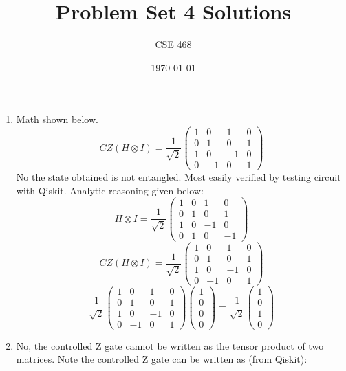 \documentclass[12pt]{article}
\title{Problem Set 4 Solutions}
\author{CSE 468}
\date{\today}
\begin{document}
\maketitle

\begin{enumerate}[font=\bfseries]
    \item Math shown below.
    \[CZ(H \otimes I) = \frac{1}{\sqrt{2}}
    \begin{pmatrix}
    1 & 0 & 1 & 0 \\
    0 & 1 & 0 & 1 \\
    1 & 0 & -1 & 0 \\
    0 & -1 & 0 & 1
    \end{pmatrix}
    \]
    No the state obtained is not entangled. Most easily verified by testing circuit with Qiskit. Analytic reasoning given below:
    \[H \otimes I = \frac{1}{\sqrt{2}}\begin{pmatrix}
    1 & 0 & 1 & 0 \\
    0 & 1 & 0 & 1 \\
    1 & 0 & -1 & 0 \\
    0 & 1 & 0 & -1
    \end{pmatrix}\]
    \[CZ(H \otimes I) = \frac{1}{\sqrt{2}}
    \begin{pmatrix}
    1 & 0 & 1 & 0 \\
    0 & 1 & 0 & 1 \\
    1 & 0 & -1 & 0 \\
    0 & -1 & 0 & 1
    \end{pmatrix}
    \]
    \[\frac{1}{\sqrt{2}}
    \begin{pmatrix}
    1 & 0 & 1 & 0 \\
    0 & 1 & 0 & 1 \\
    1 & 0 & -1 & 0 \\
    0 & -1 & 0 & 1
    \end{pmatrix}
    \begin{pmatrix}
    1 \\ 0 \\ 0 \\ 0
    \end{pmatrix}
    =
    \frac{1}{\sqrt{2}}
    \begin{pmatrix}
    1 \\ 0 \\ 1 \\ 0
    \end{pmatrix}
    \]
    \item No, the controlled Z gate cannot be written as the tensor product of two matrices. Note the controlled Z gate can be written as (from Qiskit):

\end{enumerate}
\end{document}
